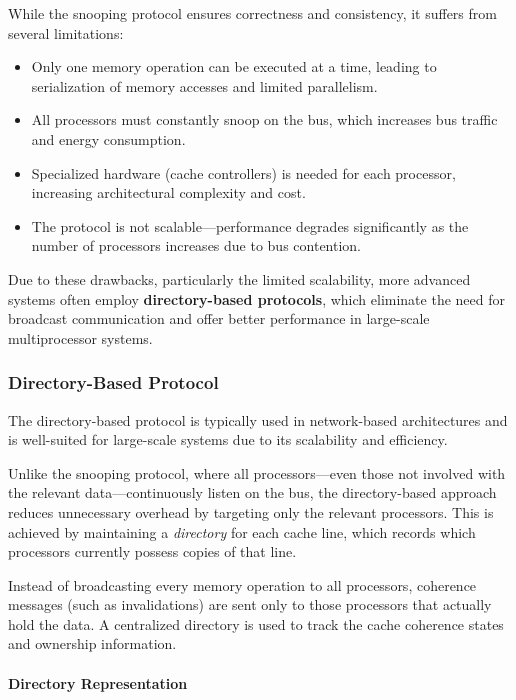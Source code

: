 \documentclass[12pt]{book}
\begin{document}
While the snooping protocol ensures correctness and consistency, it suffers from several limitations:
\begin{itemize}
    \item Only one memory operation can be executed at a time, leading to serialization of memory accesses and limited parallelism.
    \item All processors must constantly snoop on the bus, which increases bus traffic and energy consumption.
    \item Specialized hardware (cache controllers) is needed for each processor, increasing architectural complexity and cost.
    \item The protocol is not scalable—performance degrades significantly as the number of processors increases due to bus contention.
\end{itemize}

Due to these drawbacks, particularly the limited scalability, more advanced systems often employ \textbf{directory-based protocols}, which eliminate the need for broadcast communication and offer better performance in large-scale multiprocessor systems.

\subsubsection{Directory-Based Protocol}

The directory-based protocol is typically used in network-based architectures and is well-suited for large-scale systems due to its scalability and efficiency.

Unlike the snooping protocol, where all processors—even those not involved with the relevant data—continuously listen on the bus, the directory-based approach reduces unnecessary overhead by targeting only the relevant processors. This is achieved by maintaining a \textit{directory} for each cache line, which records which processors currently possess copies of that line.

Instead of broadcasting every memory operation to all processors, coherence messages (such as invalidations) are sent only to those processors that actually hold the data. A centralized directory is used to track the cache coherence states and ownership information.

\paragraph{Directory Representation}
\end{document}
